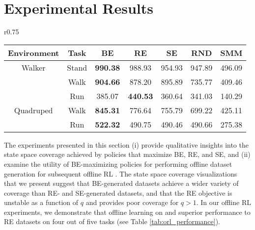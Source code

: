 \section{Experimental Results}
%
%
%
%
\begin{wraptable}{r}{0.75\textwidth}
    \vspace{-4mm}
    \centering
    \begin{tabular}{|cc|ccccc|}
        \hline
        Environment & Task & BE & RE & SE & RND & SMM \\
        \hline
        Walker & Stand & \textbf{990.38} & 988.93 & 954.93 & 947.89 & 496.09 \\
        & Walk & \textbf{904.66} & 878.20 & 895.89 & 735.77 & 409.46  \\
        & Run & 385.07 & \textbf{440.53} & 360.64 & 341.03 & 140.29  \\
        \hline
        Quadruped & Walk & \textbf{845.31} & 776.64 & 755.79 & 699.22 & 425.11  \\
        & Run & \textbf{522.32} & 490.75 & 490.46 & 490.66 & 275.38  \\
        \hline
    \end{tabular}
    \caption{\small {} }
    \label{tab:orl_performance}
    \vspace{-3mm}
\end{wraptable}
%
%
The experiments presented in this section (i) provide qualitative insights into the state space coverage achieved by policies that maximize BE, RE, and SE, and (ii) examine the utility of BE-maximizing policies for performing offline dataset generation for subsequent offline RL . The state space coverage visualizations that we present suggest that BE-generated datasets achieve a wider variety of coverage than RE- and SE-generated datasets, and that the RE objective is unstable as a function of $q$ and provides poor coverage for $q > 1$.  In our offline RL experiments, we demonstrate that offline learning on  and superior performance to RE datasets on four out of five tasks (see Table \ref{tab:orl_performance}).



